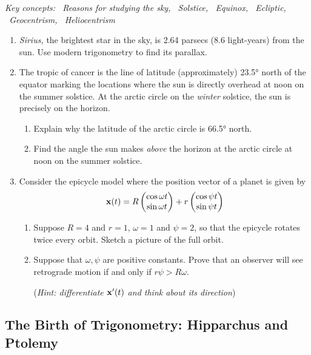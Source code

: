 \begin{exercises}{}{}
	\hangindent\leftmargini\emph{Key concepts: \ Reasons for studying the sky, \ Solstice, \ Equinox, \ Ecliptic, \ Geocentrism, \ Heliocentrism}	
	
	\begin{enumerate}
	  \item \emph{Sirius,} the brightest star in the sky, is 2.64 parsecs (8.6 light-years) from the sun. Use modern trigonometry to find its parallax.
	
		\item\label{exs:tropicstick1} The tropic of cancer is the line of latitude (approximately) \ang{23.5} north of the equator marking the locations where the sun is directly overhead at noon on the summer solstice.\footnotemark{} At the arctic circle on the \emph{winter} solstice, the sun is precisely on the horizon.
		\begin{enumerate}
		  \item Explain why the latitude of the arctic circle is \ang{66.5} north.
		  \item Find the angle the sun makes \emph{above} the horizon at the arctic circle at noon on the summer solstice.
		\end{enumerate}
	  
	  \item Consider the epicycle model where the position vector of a planet is given by
	  \[
	  	{\mathbf{x}}(t) =R\begin{pmatrix}\cos \omega t\\\sin \omega t\end{pmatrix} 
	  		+r\begin{pmatrix}\cos \psi t\\\sin \psi t\end{pmatrix}
	  \]
	  \begin{enumerate}
	    \item Suppose $R=4$ and $r=1$, $\omega=1$ and $\psi=2$, so that the epicycle rotates twice every orbit. Sketch a picture of the full orbit.
	    \item Suppose that $\omega,\psi$ are positive constants. Prove that an observer will see retrograde motion if and only if $r\psi>R\omega$.\par
	  	(\emph{Hint: differentiate ${\mathbf{x}}'(t)$ and think about its direction})
	  \end{enumerate}
	\end{enumerate}
\end{exercises}



\clearpage



\subsection{The Birth of Trigonometry: Hipparchus and Ptolemy}

